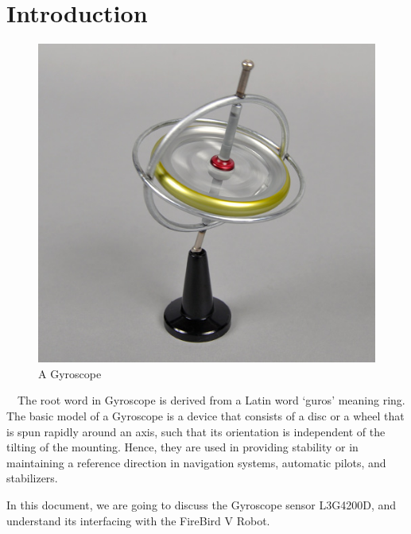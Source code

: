 \documentclass[a4paper,12 pt]{article}
\begin{document}
\section{Introduction}
\begin{figure}
  \begin{center}
\vspace{-10mm}
    \includegraphics[scale=0.2]{Gyr0.jpg}
  \end{center}
  \caption{A Gyroscope}
\end{figure}

\ \ The root word in Gyroscope is derived from a Latin word ‘guros’ meaning ring. The basic model of a Gyroscope is a device that consists of a disc or a wheel that is spun rapidly around an axis, such that its orientation is independent of the tilting of the mounting. Hence, they are used in providing stability or in maintaining a reference direction in navigation systems, automatic pilots, and stabilizers.

In this document, we are going to discuss the Gyroscope sensor L3G4200D, and understand its interfacing with the FireBird V Robot.
\end{document}
